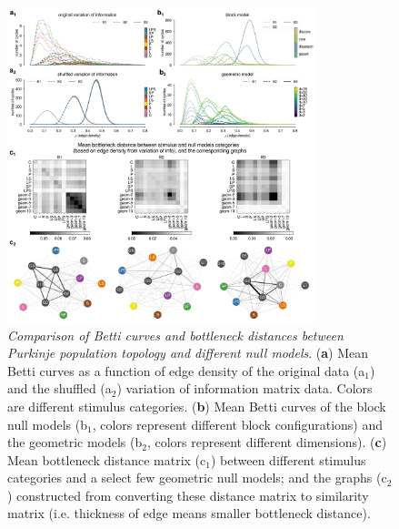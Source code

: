 \begin{figure}[H]
    \centering
    \includegraphics[width=0.8\textwidth,center]{../figures/report/Fig3.png}
    \caption{\label{fig:3}
    \textit{Comparison of Betti curves and bottleneck distances between Purkinje population topology and different null models}.
    (\textbf{a}) Mean Betti curves as a function of edge density of the original data (a$_1$) and the shuffled (a$_2$) variation of information matrix data. Colors are different stimulus categories.
    (\textbf{b}) Mean Betti curves of the block null models (b$_1$, colors represent different block configurations) and the geometric models (b$_2$, colors represent different dimensions).
    (\textbf{c}) Mean bottleneck distance matrix (c$_1$) between different stimulus categories and a select few geometric null models; and the graphs (c$_2$) constructed from converting these distance matrix to similarity matrix (i.e. thickness of edge means smaller bottleneck distance).
    }
\end{figure}
